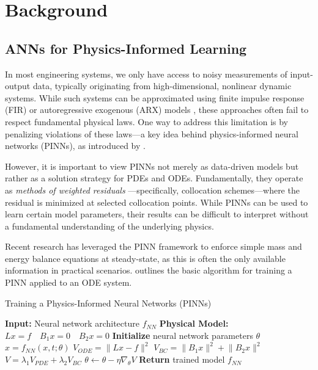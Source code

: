 \documentclass[fontsize=11pt]{article}
\newcommand{\norm}[1]{\lVert #1 \rVert}
\theoremstyle{definition}
\begin{document}
\section{Background}

\subsection{ANNs for Physics-Informed Learning}

In most engineering systems, we only have access to noisy measurements of 
input-output data, typically originating from high-dimensional, nonlinear dynamic 
systems. While such systems can be approximated using finite impulse response (FIR) 
or autoregressive exogenous (ARX) models \citep{ljung:1999}, these approaches often fail to respect 
fundamental physical laws. One way to address this limitation is by penalizing 
violations of these laws—a key idea behind physics-informed neural networks (PINNs), 
as introduced by \cite{raissi:perdikaris:karniadakis:2019}.

However, it is important to view PINNs not merely as data-driven models but 
rather as a solution strategy for PDEs and ODEs. Fundamentally, they operate 
as \textit{methods of weighted residuals} \citep{villadsen:stewart:1967}—specifically, collocation schemes—where 
the residual is minimized at selected collocation points. While PINNs can be 
used to learn certain model parameters, their results can be difficult to interpret 
without a fundamental understanding of the underlying physics.

Recent research has leveraged the PINN framework to enforce simple mass and energy 
balance equations at steady-state, as this is often the only available information 
in practical scenarios.  outlines the basic algorithm for training 
a PINN applied to an ODE system.

\begin{algorithm}[h]
\caption{Training a Physics-Informed Neural Networks (PINNs)}
\label{alg:PINNs}
\begin{algorithmic}[1]
\State \textbf{Input:} Neural network architecture $f_{NN}$
\State \textbf{Physical Model:} $Lx=f \quad B_1 x = 0 \quad B_2 x = 0$
\State \textbf{Initialize} neural network parameters $\theta$
\Repeat
    \State $x = f_{NN}(x,t; \theta)$
    \State $V_{ODE} = \norm{Lx - f}^{2}$ 
    \State $V_{BC} = \norm{B_1 x}^{2} + \norm{B_2 x}^{2}$
    \State $V = \lambda_1 V_{PDE}  + \lambda_2 V_{BC}$
    \State $\theta \leftarrow \theta - \eta \nabla_{\theta} V$
\State \textbf{Return} trained model $f_{NN}$
\end{algorithmic}
\end{algorithm}
    
\end{document}
